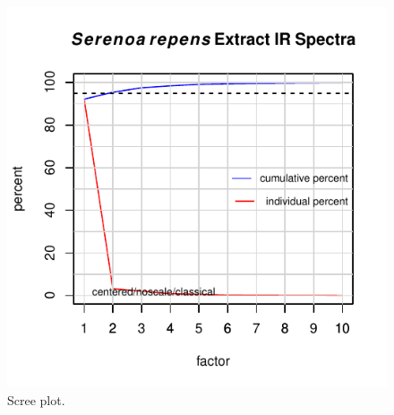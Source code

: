 \documentclass[letter,10pt,twocolumn,twoside,printwatermark=false]{pinp}
\begin{document}
\begin{Shaded}
\begin{Highlighting}[]
\end{Highlighting}
\end{Shaded}

\begin{figure}

{\centering \includegraphics{ChemoSpec2_files/figure-latex/Chunk24-1} 

}

\caption{\label{scree}Scree plot.}\label{fig:Chunk24}
\end{figure}

\begin{Shaded}
\begin{Highlighting}[]
\end{Highlighting}
\end{Shaded}
\end{document}

